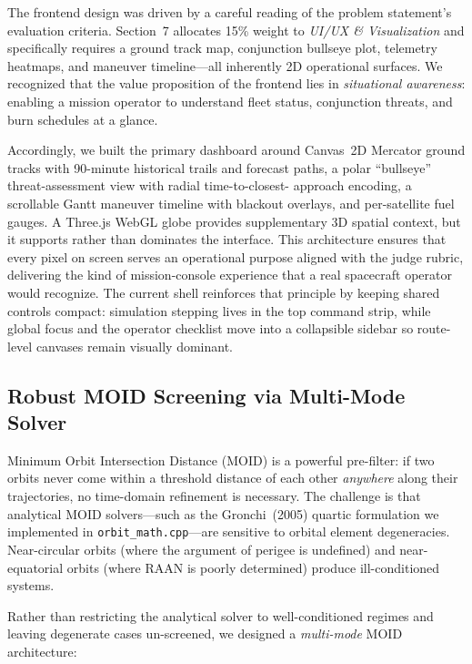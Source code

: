 \documentclass[10pt,twocolumn,letterpaper]{article}
\begin{document}
The frontend design was driven by a careful reading of the problem
statement's evaluation criteria.  Section~7 allocates 15\% weight to
\emph{UI/UX \& Visualization} and specifically requires a ground track
map, conjunction bullseye plot, telemetry heatmaps, and maneuver
timeline---all inherently 2D operational surfaces.  We recognized that
the value proposition of the frontend lies in \emph{situational
awareness}: enabling a mission operator to understand fleet status,
conjunction threats, and burn schedules at a glance.

Accordingly, we built the primary dashboard around Canvas~2D Mercator
ground tracks with 90-minute historical trails and forecast paths, a
polar ``bullseye'' threat-assessment view with radial time-to-closest-%
approach encoding, a scrollable Gantt maneuver timeline with blackout
overlays, and per-satellite fuel gauges.  A Three.js WebGL globe provides
supplementary 3D spatial context, but it supports rather than dominates
the interface.  This architecture ensures that every pixel on screen serves
an operational purpose aligned with the judge rubric, delivering the kind
of mission-console experience that a real spacecraft operator would
recognize.  The current shell reinforces that principle by keeping shared
controls compact: simulation stepping lives in the top command strip,
while global focus and the operator checklist move into a collapsible
sidebar so route-level canvases remain visually dominant.

\subsection{Robust MOID Screening via Multi-Mode Solver}

Minimum Orbit Intersection Distance (MOID) is a powerful pre-filter:
if two orbits never come within a threshold distance of each other
\emph{anywhere} along their trajectories, no time-domain refinement is
necessary.  The challenge is that analytical MOID solvers---such as the
Gronchi~(2005) quartic formulation we implemented in
\texttt{orbit\_math.cpp}---are sensitive to orbital element degeneracies.
Near-circular orbits (where the argument of perigee is undefined) and
near-equatorial orbits (where RAAN is poorly determined) produce
ill-conditioned systems.

Rather than restricting the analytical solver to well-conditioned regimes
and leaving degenerate cases un-screened, we designed a \emph{multi-mode}
MOID architecture:
\end{document}
